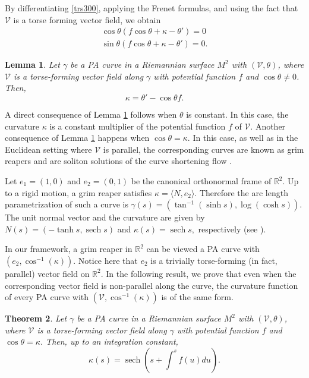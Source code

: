 \documentclass[12pt]{amsart}
\def\r{\mathbb R}
\def\v{\mathcal V}
\DeclareMathOperator{\sech}{sech}
\newtheorem{theorem}{Theorem}[section]
\newtheorem{lemma}[theorem]{Lemma}
\theoremstyle{definition}
\begin{document}
By differentiating \eqref{trs300}, applying the Frenet formulas, and using the fact that $\v$ is a torse forming vector field, we obtain
\begin{equation}
\left. 
\begin{array}{r}
\cos \theta(f\cos \theta+\kappa-\theta') =0 \\ 
\sin \theta(f\cos \theta+\kappa-\theta')  =0.
\end{array}%
\right. \label{trs31}
\end{equation}

\begin{lemma}\label{lem31}
Let $\gamma$ be a PA curve in a Riemannian surface $M^2$ with $(\v,\theta)$, where $\v$ is a torse-forming vector field along $\gamma$ with potential function $f$ and $\cos \theta \neq 0$. Then,
\begin{equation}
\kappa=\theta'-\cos \theta f. \label{trs32}
\end{equation}
\end{lemma}

A direct consequence of Lemma \ref{lem31} follows when $\theta$ is constant. In this case, the curvature $\kappa$ is a constant multiplier of the potential function $f$ of $\v$. Another consequence of Lemma \ref{lem31} happens when $\cos \theta=\kappa$. In this case, as well as in the  Euclidean setting where $\v$ is parallel, the corresponding curves are known as grim reapers and are soliton solutions of the curve shortening flow \cite{lo1}. 

Let $e_1=(1,0)$ and $e_2=(0,1)$ be the canonical orthonormal frame of $\r^2$. Up to a rigid motion, a grim reaper satisfies $\kappa=\langle N,e_2\rangle$.  Therefore the arc length parametrization of such a curve is $\gamma(s)=(\tan^{-1}(\sinh s), \log (\cosh s)).$ The unit normal vector and the curvature are given by $N(s)=(-\tanh s,\sech s)$ and $\kappa(s)=\sech s,$ respectively (see \cite{lo1}).

In our framework, a grim reaper in $ \r^2$ can be viewed a PA curve with $(e_2,\cos^{-1}(\kappa))$. Notice here that $e_2$ is a trivially torse-forming (in fact, parallel) vector field on $\r^2$. In the following result, we prove that even when the corresponding vector field is non-parallel along the curve, the curvature function of every PA curve with $(\v,\cos^{-1}(\kappa))$ is of the same form.

\begin{theorem}\label{thm31}
Let $\gamma$ be a PA curve in a Riemannian surface $M^2$ with $(\v,\theta)$, where $\v$ is a torse-forming vector field along $\gamma$ with potential function $f$ and $\cos \theta=\kappa$. Then, up to an integration constant,
\begin{equation}
\kappa(s)=\sech\left (s+\int^s f(u) du \right) .\label{trs311}
\end{equation}
\end{theorem}
\end{document}
